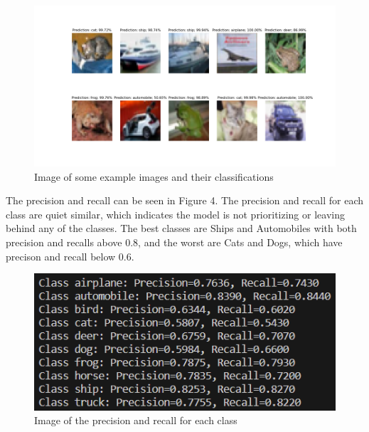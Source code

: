 \documentclass[letterpaper, 12pt]{article}
\begin{document}
\begin{figure}[H]
\centering
\includegraphics[scale = 0.5]{example_predictions}
\caption{Image of some example images and their classifications}
\end{figure}

The precision and recall can be seen in Figure 4. The precision and recall for each class are quiet similar, which indicates the model is not prioritizing or leaving behind any of the classes. The best classes are Ships and Automobiles with both precision and recalls above 0.8, and the worst are Cats and Dogs, which have precison and recall below 0.6.

\begin{figure}[H]
\centering
\includegraphics[scale = 0.8]{precision_and_recall}
\caption{Image of the precision and recall for each class}
\end{figure}
\end{document}
